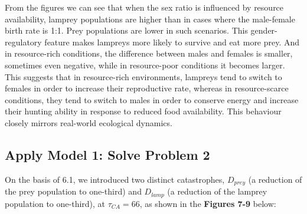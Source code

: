 \documentclass{mcmthesis}
\begin{document}
From the figures we can see that when the sex ratio is influenced by resource availability, lamprey populations are higher than in cases where the male-female birth rate is 1:1. Prey populations are lower in such scenarios. This gender-regulatory feature makes lampreys more likely to survive and eat more prey. And in resource-rich conditions, the difference between males and females is smaller, sometimes even negative, while in resource-poor conditions it becomes larger. This suggests that in resource-rich environments, lampreys tend to switch to females in order to increase their reproductive rate, whereas in resource-scarce conditions, they tend to switch to males in order to conserve energy and increase their hunting ability in response to reduced food availability. This behaviour closely mirrors real-world ecological dynamics.


\subsection{Apply Model 1: Solve Problem 2}

On the basis of 6.1, we introduced two distinct catastrophes, $D_{prey}$ (a reduction of the prey population to one-third) and $D_{lamp}$ (a reduction of the lamprey population to one-third), at $\tau_{CA} = 66$, as shown in the \textbf{Figures 7-9} below:
\end{document}
